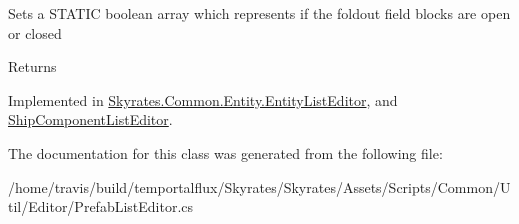Sets a S\-T\-A\-T\-I\-C boolean array which represents if the foldout field blocks are open or closed 

\begin{DoxyReturn}{Returns}

\end{DoxyReturn}


Implemented in \hyperlink{class_skyrates_1_1_common_1_1_entity_1_1_entity_list_editor_a690165827351791ebe87d1f1ebc3e9e8}{Skyrates.\-Common.\-Entity.\-Entity\-List\-Editor}, and \hyperlink{class_ship_component_list_editor_a32bf47a4ec5ee1b5769a986bcaf6cf06}{Ship\-Component\-List\-Editor}.



The documentation for this class was generated from the following file\-:\begin{DoxyCompactItemize}
\item 
/home/travis/build/temportalflux/\-Skyrates/\-Skyrates/\-Assets/\-Scripts/\-Common/\-Util/\-Editor/Prefab\-List\-Editor.\-cs\end{DoxyCompactItemize}
